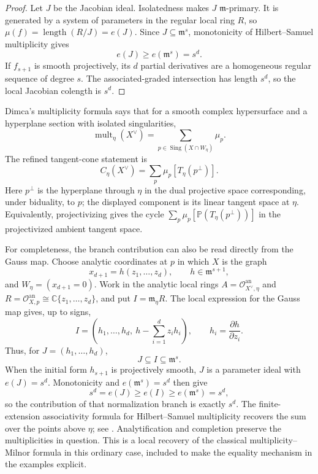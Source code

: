 \documentclass[11pt,a4paper]{article}
\theoremstyle{definition}
\newcommand{\PP}{\mathbb P}
\newcommand{\cO}{\mathcal O}
\newcommand{\m}{\mathfrak m}
\newcommand{\mult}{\operatorname{mult}}
\newcommand{\Sing}{\operatorname{Sing}}
\begin{document}
\begin{proof}
Let $J$ be the Jacobian ideal.  Isolatedness makes $J$ $\m$-primary.  It is
generated by a system of parameters in the regular local ring $R$, so
$\mu(f)=\operatorname{length}(R/J)=e(J)$.  Since $J\subseteq\m^s$,
monotonicity of Hilbert--Samuel multiplicity gives
\[
 e(J)\geq e(\m^s)=s^d.
\]
If $f_{s+1}$ is smooth projectively, its $d$ partial derivatives are a
homogeneous regular sequence of degree $s$.  The associated-graded
intersection has length $s^d$, so the local Jacobian colength is $s^d$.
\end{proof}

Dimca's multiplicity formula \cite{Dimca1986} says that for a smooth complex
hypersurface and a hyperplane section with isolated singularities,
\begin{equation}\label{eq:dimca}
 \mult_\eta(X^\vee)=\sum_{p\in\Sing(X\cap W_\eta)}\mu_p.
\end{equation}
The refined tangent-cone statement
\cite[Proposition~11.24]{Dimca1987} is
\begin{equation}\label{eq:tangent-cone}
 C_\eta(X^\vee)=\sum_p\mu_p[T_\eta(p^\perp)].
\end{equation}
Here $p^\perp$ is the hyperplane through $\eta$ in the dual projective space
corresponding, under biduality, to $p$; the displayed component is its linear
tangent space at $\eta$.  Equivalently, projectivizing gives the cycle
$\sum_p\mu_p[\PP(T_\eta(p^\perp))]$ in the projectivized ambient tangent
space.

For completeness, the branch contribution can also be read directly from
the Gauss map.  Choose analytic coordinates at $p$ in which $X$ is the graph
\[
 x_{d+1}=h(z_1,\ldots,z_d),\qquad h\in\m^{s+1},
\]
and $W_\eta=(x_{d+1}=0)$.  Work in the analytic local rings
$A=\cO^{\mathrm{an}}_{X^\vee,\eta}$ and
$R=\cO^{\mathrm{an}}_{X,p}\cong\mathbb C\{z_1,\ldots,z_d\}$, and put
$I=\m_\eta R$.  The local expression for the Gauss map gives, up to signs,
\begin{equation}\label{eq:gauss-ideal}
 I=\left(
 h_1,\ldots,h_d,\ h-\sum_{i=1}^d z_i h_i
 \right),\qquad h_i=\frac{\partial h}{\partial z_i}.
\end{equation}
Thus, for $J=(h_1,\ldots,h_d)$,
\[
 J\subseteq I\subseteq\m^s.
\]
When the initial form $h_{s+1}$ is projectively smooth, $J$ is a parameter
ideal with $e(J)=s^d$.  Monotonicity and $e(\m^s)=s^d$ then give
\[
 s^d=e(J)\geq e(I)\geq e(\m^s)=s^d,
\]
so the contribution of that normalization branch is exactly $s^d$.
The finite-extension associativity formula for Hilbert--Samuel multiplicity
recovers the sum over the points above $\eta$; see
\cite[Chapter~VIII, \S10, Corollary~1]{ZariskiSamuelII}.  Analytification and
completion preserve the multiplicities in question.  This is a local recovery
of the classical multiplicity--Milnor formula in this ordinary case, included
to make the equality mechanism in the examples explicit.
\end{document}
